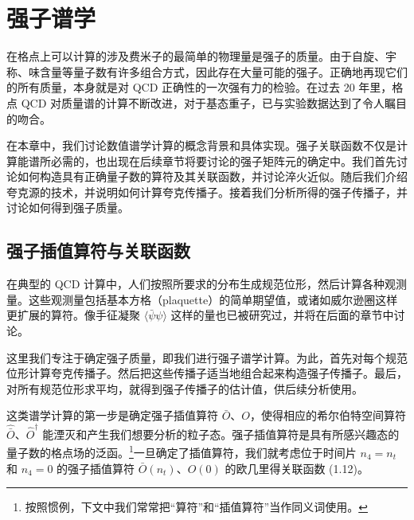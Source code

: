 
\chapter{强子谱学}

在格点上可以计算的涉及费米子的最简单的物理量是强子的质量。由于自旋、宇称、味含量等量子数有许多组合方式，因此存在大量可能的强子。正确地再现它们的所有质量，本身就是对 QCD 正确性的一次强有力的检验。在过去 20 年里，格点 QCD 对质量谱的计算不断改进，对于基态重子，已与实验数据达到了令人瞩目的吻合。

在本章中，我们讨论数值谱学计算的概念背景和具体实现。强子关联函数不仅是计算能谱所必需的，也出现在后续章节将要讨论的强子矩阵元的确定中。我们首先讨论如何构造具有正确量子数的算符及其关联函数，并讨论淬火近似。随后我们介绍夸克源的技术，并说明如何计算夸克传播子。接着我们分析所得的强子传播子，并讨论如何得到强子质量。

\section{强子插值算符与关联函数}

在典型的 QCD 计算中，人们按照所要求的分布生成规范位形，然后计算各种观测量。这些观测量包括基本方格（plaquette）的简单期望值，或诸如威尔逊圈这样更扩展的算符。像手征凝聚 $\langle\bar\psi\psi\rangle$ 这样的量也已被研究过，并将在后面的章节中讨论。

这里我们专注于确定强子质量，即我们进行强子谱学计算。为此，首先对每个规范位形计算夸克传播子。然后把这些传播子适当地组合起来构造强子传播子。最后，对所有规范位形求平均，就得到强子传播子的估计值，供后续分析使用。

这类谱学计算的第一步是确定强子插值算符 $\bar{O}$、$O$，使得相应的希尔伯特空间算符 $\hat{\bar{O}}$、$\hat{O}^\dagger$ 能湮灭和产生我们想要分析的粒子态。强子插值算符是具有所感兴趣态的量子数的格点场的泛函。\footnote{按照惯例，下文中我们常常把“算符”和“插值算符”当作同义词使用。}一旦确定了插值算符，我们就考虑位于时间片 $n_4 = n_t$ 和 $n_4 = 0$ 的强子插值算符 $\bar{O}(n_t)$、$O(0)$ 的欧几里得关联函数 (1.12)。

